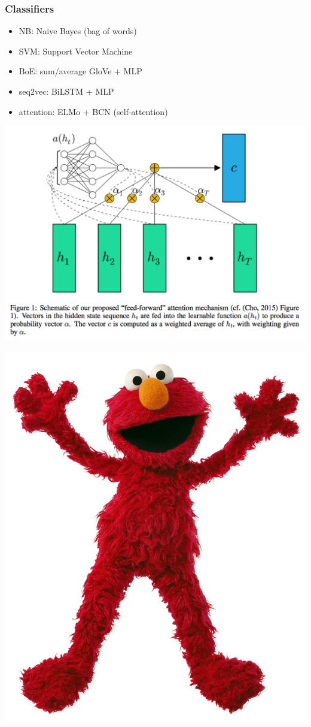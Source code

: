 \documentclass[t,xcolor={svgnames,table}]{beamer}
\begin{document}
\begin{frame}
	\frametitle{Classifiers}
	
	\begin{minipage}{.7\textwidth}
	\begin{itemize}\setlength\itemsep{1em}
		\item NB: Naive Bayes (bag of words)
		\item SVM: Support Vector Machine
		\item BoE: sum/average GloVe + MLP
		\item seq2vec: BiLSTM + MLP
		\item attention: ELMo + BCN (self-attention)
	\end{itemize}
	\end{minipage}
	\begin{minipage}{.29\textwidth}
	\centering
	\hspace{-2cm}\includegraphics[trim={3cm 3cm 3cm 0},clip,width=1.5\textwidth]{FeedForwardAttention.png}
	
	\includegraphics[width=.7\textwidth]{elmo.jpg}
	\end{minipage}
\end{frame}
\end{document}
